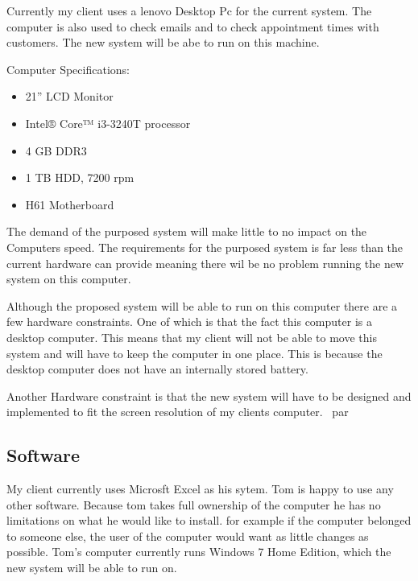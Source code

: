 \begin{flushleft}

Currently my client uses a lenovo Desktop Pc for the current system. The computer is also used to check emails and to check appointment times with customers. The new system will be abe to run on this machine.

Computer Specifications:

\begin{itemize}
	\item{21'' LCD Monitor}
	\item{Intel® Core™ i3-3240T processor}
	\item{4 GB DDR3}
	\item{1 TB HDD, 7200 rpm}
	\item{H61 Motherboard}
\end{itemize}

The demand of the purposed system will make little to no impact on the Computers speed. The requirements for the purposed system is far less than the current hardware can provide meaning there wil be no problem running the new system on this computer. \par

Although the proposed system will be able to run on this computer there are a few hardware constraints. One of which is that the fact this computer is a desktop computer. This means that my client will not be able to move this system and will have to keep the computer in one place. This is because the desktop computer does not have an internally stored battery. \par

Another Hardware constraint is that the new system will have to be designed and implemented to fit the screen resolution of my clients computer. \ par

\end{flushleft}


\subsection{Software}

\begin{flushleft}
My client currently uses Microsft Excel as his sytem. Tom is happy to use any other software. Because tom takes full ownership of the computer he has no limitations on what he would like to install. for example if the computer belonged to someone else, the user of the computer would want as little changes as possible. Tom's computer currently runs Windows 7 Home Edition, which the new system will be able to run on.
\end{flushleft}


